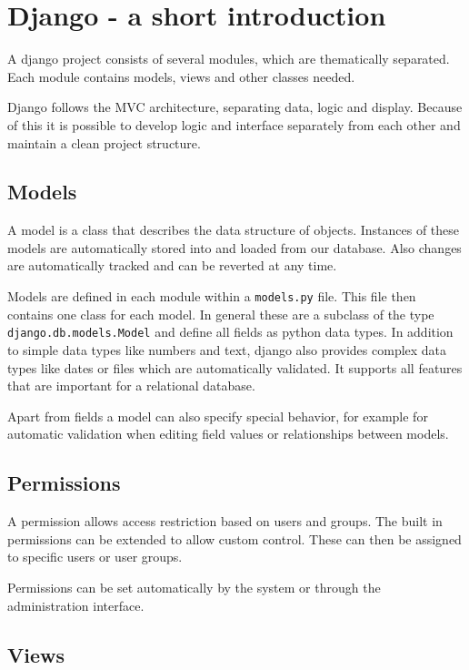 \newpage
\section{Django - a short
introduction}\label{django---a-short-introduction}

A django project consists of several modules, which are thematically
separated. Each module contains models, views and other classes needed.

Django follows the MVC architecture, separating data, logic and display.
Because of this it is possible to develop logic and interface separately
from each other and maintain a clean project structure.

\subsection{Models}\label{models-1}

A model is a class that describes the data structure of objects.
Instances of these models are automatically stored into and loaded from
our database. Also changes are automatically tracked and can be reverted
at any time.

Models are defined in each module within a \texttt{models.py} file. This
file then contains one class for each model. In general these are a
subclass of the type \texttt{django.db.models.Model} and define all
fields as python data types. In addition to simple data types like
numbers and text, django also provides complex data types like dates or
files which are automatically validated. It supports all features that
are important for a relational database.

Apart from fields a model can also specify special behavior, for example
for automatic validation when editing field values or relationships
between models.

\subsection{Permissions}\label{permissions}

A permission allows access restriction based on users and groups. The
built in permissions can be extended to allow custom control. These can
then be assigned to specific users or user groups.

Permissions can be set automatically by the system or through the
administration interface.

\subsection{Views}\label{views-1}


